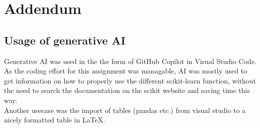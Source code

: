 \documentclass[11pt,a4paper]{article}
\begin{document}
\clearpage
\section{Addendum}
\subsection{Usage of generative AI}
Generative AI was used in the the form of GitHub Copilot in Visual Studio Code. As the coding effort for this assignment
was managable, AI was mostly used to get information on how to properly use the different scikit-learn function, without
the need to search the documentation on the scikit website and saving time this way.
\\Another usecase was the import of tables (pandas etc.) from visual studio to a nicely formatted table in LaTeX.
\end{document}

